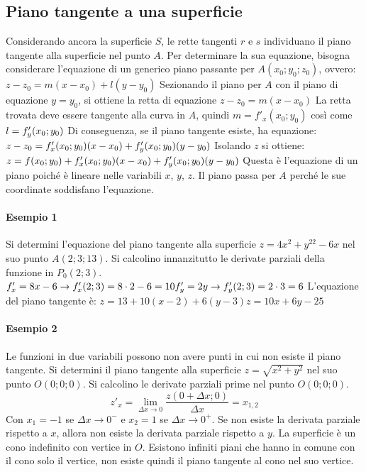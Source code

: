 \documentclass[a4paper,14pt]{extarticle}
\begin{document}
\subsection{Piano tangente a una superficie} Considerando ancora la superficie $S$, le rette tangenti $r$ e $s$ individuano il piano tangente alla superficie nel punto $A$. Per determinare la sua equazione, bisogna considerare l’equazione di un generico piano passante per $A(x_0;y_0;z_0)$, ovvero: $z-z_0=m(x-x_0)+l(y-y_0)$ \newline Sezionando il piano per $A$ con il piano di equazione $y=y_0$, si ottiene la retta di equazione $z-z_0=m(x-x_0)$ \newline La retta trovata deve essere tangente alla curva in $A$, quindi $m=f'_x(x_0;y_0)$  così come $ l=f'_y(x_0;y_0) \\$ \newline Di conseguenza, se il piano tangente esiste, ha equazione: $\\ z-z_0=f'_x(x_0;y_0)(x-x_0)+f'_y(x_0;y_0)(y-y_0) \\$ \newline Isolando $z$ si ottiene: $z=f(x_0;y_0)+f'_x(x_0;y_0)(x-x_0)+f'_y(x_0;y_0)(y-y_0) \\$ \newline Questa è l’equazione di un piano poiché è lineare nelle variabili $x$, $y$, $z$. Il piano passa per $A$ perché le sue coordinate soddisfano l’equazione.

\paragraph{Esempio 1 \\} Si determini l’equazione del  piano tangente alla superficie $z=4x^2+y^22-6x$  nel suo punto $A(2;3;13)$. Si calcolino innanzitutto le derivate parziali della funzione in $P_0(2;3)$. $\\f'_x=8x-6 \xrightarrow{} f'_x (2;3)=8 \cdot2-6=10 \\f'_y =2y \xrightarrow{} f'_y(2;3)=2 \cdot 3=6$ \newline L’equazione del piano tangente è: $z=13+10(x-2)+6(y-3)z=10x+6y-25$

\paragraph{Esempio 2 \\} Le funzioni in due variabili possono non avere punti in cui non esiste il piano tangente. Si determini il piano tangente alla superficie $z= \sqrt{x^2+y^2}  $ nel suo punto $O(0;0;0)$. \newline
Si calcolino le derivate parziali prime nel punto $O(0;0;0)$. \large \[ z'_x = \lim_{\Delta x \to 0} \frac{z(0+\Delta x; 0)}{\Delta x} = x_{1,2}\] \normalsize Con $x_1 = -1$ se $\Delta x \to 0^-$ e $x_2 = 1$ se $\Delta x \to 0^+$. \newline
Se non esiste la derivata parziale rispetto a $x$, allora non esiste la derivata parziale rispetto a $y$. La superficie è un cono indefinito con vertice in $O$. Esistono infiniti piani che hanno in comune con il cono solo il vertice, non esiste quindi il piano tangente al cono nel suo vertice.
\end{document}
